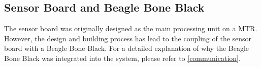 \begin{table}[thpb]
\centering
\caption{100W Maxon BLDC Motor Parameters}
\vspace{-0.2in}
\label{motor_parameters}
\begin{center}%
\end{center}
\end{table}

\subsection{Sensor Board and Beagle Bone Black}
\label{sensor_bbb}
The sensor board was originally designed as the main processing unit on a MTR. 
However, the design and building process has lead to the coupling of the sensor board with a Beagle Bone Black.
For a detailed explanation of why the Beagle Bone Black was integrated into the system, please refer to \ref{communication}.

